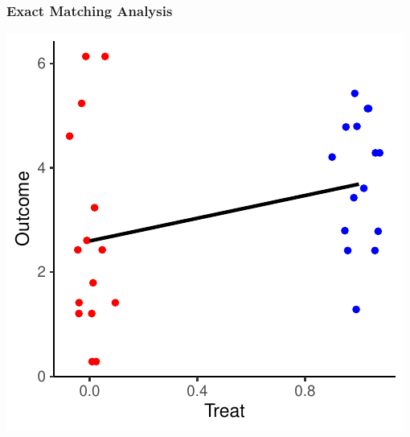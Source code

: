 \documentclass[xcolor=x11names,compress]{beamer}\usepackage[]{graphicx}\usepackage[]{color}
\makeatletter
\def\maxwidth{ %
  \ifdim\Gin@nat@width>\linewidth
    \linewidth
  \else
    \Gin@nat@width
  \fi
}
\newenvironment{knitrout}{}{} %
\renewcommand{\(}{\begin{columns}}
\renewcommand{\)}{\end{columns}}
\newcommand{\<}[1]{\begin{column}{#1}}
\renewcommand{\>}{\end{column}}
\makeatother
\begin{document}
\begin{frame}
\frametitle{Exact Matching Analysis}
\begin{center}
\begin{knitrout}
\color{fgcolor}
\includegraphics[width=\maxwidth]{figure/exact_matching_analysis3-1} 

\end{knitrout}
\end{center}
\end{frame}
\end{document}
